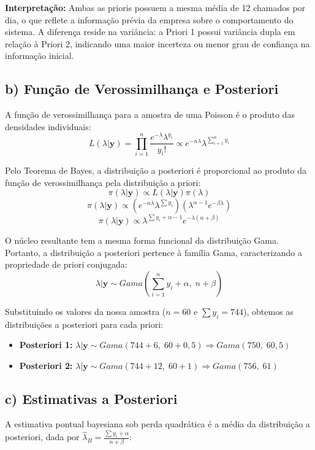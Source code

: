 \documentclass[brazil, a4paper, 12pt]{article}
\begin{document}
\textbf{Interpretação:} Ambas as prioris possuem a mesma média de 12 chamados por dia, o que reflete a informação prévia da empresa sobre o comportamento do sistema. A diferença reside na variância: a Priori 1 possui variância dupla em relação à Priori 2, indicando uma maior incerteza ou menor grau de confiança na informação inicial.

\subsection{b) Função de Verossimilhança e Posteriori}
A função de verossimilhança para a amostra de uma Poisson é o produto das densidades individuais:
$$L(\lambda | \mathbf{y}) = \prod_{i=1}^{n} \frac{e^{-\lambda} \lambda^{y_i}}{y_i!} \propto e^{-n\lambda} \lambda^{\sum_{i=1}^{n} y_i}$$

Pelo Teorema de Bayes, a distribuição a posteriori é proporcional ao produto da função de verossimilhança pela distribuição a priori:
$$\pi(\lambda | \mathbf{y}) \propto L(\lambda | \mathbf{y}) \pi(\lambda)$$
$$\pi(\lambda | \mathbf{y}) \propto \left( e^{-n\lambda} \lambda^{\sum y_i} \right) \left( \lambda^{\alpha-1} e^{-\beta\lambda} \right)$$
$$\pi(\lambda | \mathbf{y}) \propto \lambda^{\sum y_i + \alpha - 1} e^{-\lambda(n+\beta)}$$

O núcleo resultante tem a mesma forma funcional da distribuição Gama. Portanto, a distribuição a posteriori pertence à família Gama, caracterizando a propriedade de priori conjugada:
$$\lambda | \mathbf{y} \sim Gama\left(\sum_{i=1}^{n} y_i + \alpha, \; n + \beta\right)$$

Substituindo os valores da nossa amostra ($n=60$ e $\sum y_i = 744$), obtemos as distribuições a posteriori para cada priori:
\begin{itemize}
    \item \textbf{Posteriori 1:} $\lambda | \mathbf{y} \sim Gama(744 + 6, \; 60 + 0,5) \Rightarrow Gama(750, \; 60,5)$
    \item \textbf{Posteriori 2:} $\lambda | \mathbf{y} \sim Gama(744 + 12, \; 60 + 1) \Rightarrow Gama(756, \; 61)$
\end{itemize}

\subsection{c) Estimativas a Posteriori}
A estimativa pontual bayesiana sob perda quadrática é a média da distribuição a posteriori, dada por $\hat{\lambda}_B = \frac{\sum y_i + \alpha}{n + \beta}$:
\end{document}

